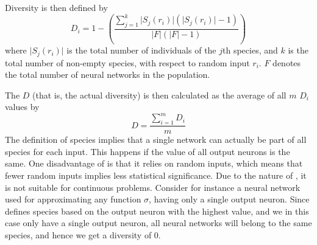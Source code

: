 Diversity is then defined by
%
\begin{equation*}\label{eq:sdi}
  D_i = 1 - \left(\frac{\sum_{j=1}^{k}\lvert S_j\left(r_i\right)\rvert\left(\lvert S_j\left(r_i\right)\rvert - 1\right)}{\lvert F\rvert \left(\lvert F\rvert - 1\right)}\right) 
\end{equation*}
%
where $\lvert S_j\left(r_i\right)\rvert$ is the total number of individuals of the $j$th species, and $k$ is the total number of non-empty species, with respect to random input $r_i$. %
$F$ denotes the total number of neural networks in the population. 

The \dia{} $D$ (that is, the actual diversity) is then calculated as the average of all $m$ $D_i$ values by
%
\[
D =\frac{\sum_{i=1}^m{D_i}}{m}
\]
%
The definition of species implies that a single network can actually be part of all species for each input. This happens if the value of all output neurons is the same. One disadvantage of \dia{} is that it relies on random inputs, which means that fewer random inputs implies less statistical significance. Due to the nature of \dia, it is not suitable for continuous problems. Consider for instance a neural network used for approximating any function $\sigma$, having only a single output neuron. Since \dia{} defines species based on the output neuron with the highest value, and we in this case only have a single output neuron, all neural networks will belong to the same species, and hence we get a diversity of 0.  
